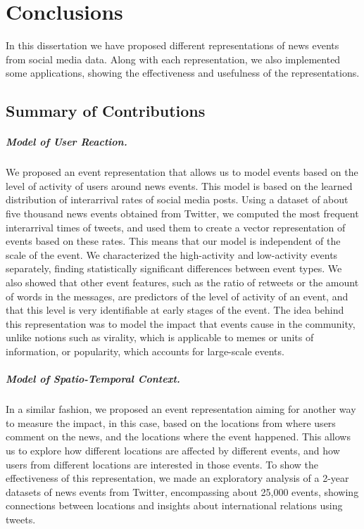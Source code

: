 \chapter{Conclusions}

In this dissertation we have proposed different representations of news events
from social media data.
%
Along with each representation, we also implemented some applications, showing
the effectiveness and usefulness of the representations.

\section{Summary of Contributions}

\paragraph{Model of User Reaction.}
%
We proposed an event representation that allows us to model events based on the
level of activity of users around news events. 
%
This model is based on the learned distribution of interarrival rates of social
media posts.
%
Using a dataset of about five thousand news events obtained from Twitter, we
computed the most frequent interarrival times of tweets, and used them to create
a vector representation of events based on these rates.
%
This means that our model is independent of the scale of the event.
%
We characterized the high-activity and low-activity events separately, finding
statistically significant differences between event types.
%
We also showed that other event features, such as the ratio of retweets or the
amount of words in the messages, are predictors of the level of activity of an
event, and that this level is very identifiable at early stages of the event.
%
The idea behind this representation was to model the impact that events cause in
the community, unlike notions such as virality, which is applicable to memes or
units of information, or popularity, which accounts for large-scale events.

\paragraph{Model of Spatio-Temporal Context.}
%
In a similar fashion, we proposed an event representation aiming for another way
to measure the impact, in this case, based on the locations from where users
comment on the news, and the locations where the event happened.
%
This allows us to explore how different locations are affected by different
events, and how users from different locations are interested in those events.
%
To show the effectiveness of this representation, we made an exploratory
analysis of a 2-year datasets of news events from Twitter, encompassing about
25,000 events, showing connections between locations and insights about
international relations using tweets.

